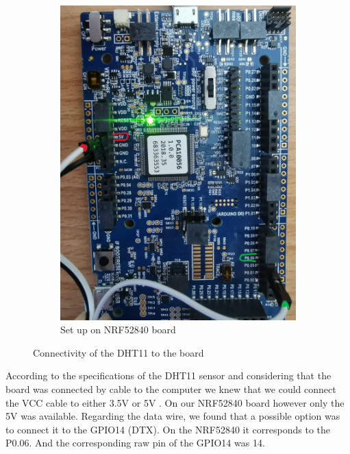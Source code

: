 \begin{figure}
\begin{subfigure}[b]{0.45\columnwidth}
        \includegraphics[width=\columnwidth]{images/ConnectivityToBoard.jpeg}
        \caption{Set up on NRF52840 board}
    \end{subfigure}
    \caption{Connectivity of the DHT11 to the board}
    \label{fig:connectionDHT11}
\end{figure}

According to the specifications of the DHT11 sensor and considering that the board was connected by cable to the computer we
knew that we could connect the VCC cable to either 3.5V or 5V \cite{b1}. On our NRF52840 board however only the 5V was available. 
Regarding the data wire, we found that a possible option was to connect it to the GPIO14 (DTX)\cite{b2}. On the NRF52840 it 
corresponds to the P0.06. And the corresponding raw pin of the GPIO14 was 14.
